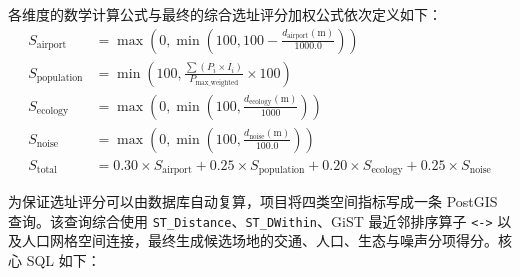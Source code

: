 \documentclass[11pt,a4paper,fontset=fandol]{ctexart}
\begin{document}
各维度的数学计算公式与最终的综合选址评分加权公式依次定义如下：
\begin{align}
    S_{\text{airport}} &= \max\left(0, \min\left(100, 100 - \frac{d_{\text{airport}}(\text{m})}{1000.0}\right)\right) \\
    S_{\text{population}} &= \min\left(100, \frac{\sum (P_i \times I_i)}{P_{\text{max\_weighted}}} \times 100\right) \\
    S_{\text{ecology}} &= \max\left(0, \min\left(100, \frac{d_{\text{ecology}}(\text{m})}{1000}\right)\right) \\
    S_{\text{noise}} &= \max\left(0, \min\left(100, \frac{d_{\text{noise}}(\text{m})}{100.0}\right)\right) \\
    S_{\text{total}} &= 0.30 \times S_{\text{airport}} + 0.25 \times S_{\text{population}} + 0.20 \times S_{\text{ecology}} + 0.25 \times S_{\text{noise}}
\end{align}

为保证选址评分可以由数据库自动复算，项目将四类空间指标写成一条 PostGIS 查询。该查询综合使用 \texttt{ST\_Distance}、\texttt{ST\_DWithin}、GiST 最近邻排序算子 \texttt{<->} 以及人口网格空间连接，最终生成候选场地的交通、人口、生态与噪声分项得分。核心 SQL 如下：
\end{document}
